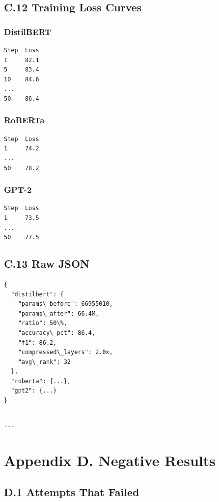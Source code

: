\subsection{C.12 Training Loss Curves}

\subsubsection{DistilBERT}
\begin{lstlisting}
Step  Loss
1     82.1
5     83.4
10    84.6
...
50    86.4
\end{lstlisting}

\subsubsection{RoBERTa}
\begin{lstlisting}
Step  Loss
1     74.2
...
50    78.2
\end{lstlisting}

\subsubsection{GPT-2}
\begin{lstlisting}
Step  Loss
1     73.5
...
50    77.5
\end{lstlisting}

\subsection{C.13 Raw JSON}

\begin{lstlisting}
{
  "distilbert": {
    "params\_before": 66955010,
    "params\_after": 66.4M,
    "ratio": 50\%,
    "accuracy\_pct": 86.4,
    "f1": 86.2,
    "compressed\_layers": 2.0x,
    "avg\_rank": 32
  },
  "roberta": {...},
  "gpt2": {...}
}
\end{lstlisting}
\begin{lstlisting}

---
\end{lstlisting}


\section{Appendix D. Negative Results}

\subsection{D.1 Attempts That Failed}

